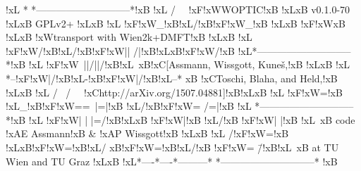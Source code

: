 !xL{}          *    *-----------------------------*!xB{}
!xL{}         / \    \ !xF{}!xW{}WOPTIC!xB{} !xL{}\!xB{} v0.1.0-70 !xL{}\!xB{} GPLv2+ !xL{}\!xB{}
!xL{}       !xF{}!xW{}_!xB{}!xL{}/!xB{}!xF{}!xW{}_!xB{}  !xL{}\!xB{} !xF{}!xW{}\!xB{}  !xL{}\!xB{} !xW{}transport with  Wien2k+DMFT!xB{} !xL{}\!xB{}
!xL{}      !xF{}!xW{}/!xB{}!xL{}/!xB{}!xF{}!xW{}|| /|!xB{}!xL{}\!xB{}!xF{}!xW{}/!xB{}   !xL{}*-----------------------------*!xB{}
!xL{}      !xF{}!xW{}\ ||/||/!xB{}!xL{}\    \!xB{}!xC{}[Assmann,  Wissgott,  Kuneš,!xB{} !xL{}\!xB{}
!xL{}     *--!xF{}!xW{}|/!xB{}!xL{}-!xB{}!xF{}!xW{}|/!xB{}!xL{}--*    \!xB{} !xC{}Toschi,  Blaha,  and  Held,!xB{} !xL{}\!xB{}
!xL{}    / \       / \    \ !xC{}http://arXiv.org/1507.04881]!xB{}!xL{}\!xB{}
!xL{}  !xF{}!xW{}=!xB{} !xL{}_!xB{}!xF{}!xW{}==\ |=|!xB{} !xL{}/!xB{}!xF{}!xW{}= /=|!xB{}  !xL{} *-----------------------------*!xB{}
!xL{} !xF{}!xW{}| | |=/!xB{}!xL{}\!xB{} !xF{}!xW{}|!xB{} !xL{}/!xB{} !xF{}!xW{}| |!xB{} !xL{}\    \!xB{} code !xA{}E Assmann!xB{} & !xA{}P Wissgott!xB{} !xL{}\!xB{}
!xL{} /!xF{}!xW{}=!xB{} !xL{}\!xB{}!xF{}!xW{}=!xB{}!xL{}/  \!xB{}!xF{}!xW{}=!xB{}!xL{}/!xB{}  !xF{}!xW{}= \=/!xB{}!xL{}\    \!xB{} at  TU  Wien  and  TU  Graz !xL{}\!xB{}
!xL{}*----*----*---------*    *-----------------------------*  !xB{}
